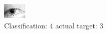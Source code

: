 \begin{figure}[h!]
\begin{center}
\includegraphics[width=0.60\columnwidth]{figures/ID1310_class_4_target_3.png}
\end{center}
\caption{ Classification: 4 actual target: 3}
\label{fig:ID1310_class_4_target_3}
\end{figure}
